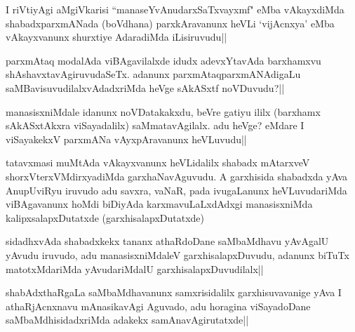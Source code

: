 \begin{artha} 
I riVtiyAgi aMgiVkarisi ``manaseYvAnudarxSaTxvayxmf" eMba vAkayxdiMda 
shabadxparxmANada (boVdhana) parxkAravanunx heVLi `vijAcnxya' eMba 
vAkayxvanunx shurxtiye AdaradiMda iLisiruvudu||
\end{artha}


\begin{artha} 
parxmAtaq modalAda viBAgavilalxde idudx adevxYtavAda barxhamxvu 
shAshavxtavAgiruvudaSeTx. adanunx parxmAtaqparxmANAdigaLu 
saMBavisuvudilalxvAdadxriMda heVge sAkASxtf noVDuvudu?||
\end{artha}


\begin{artha} 
manasisxniMdale idanunx noVDatakakxdu, beVre gatiyu ililx (barxhamx 
sAkASxtAkxra viSayadalilx) saMmatavAgilalx. adu heVge? eMdare I 
viSayakekxV parxmANa vAyxpAravanunx heVLuvudu||
\end{artha}

\begin{artha} 
tatavxmasi muMtAda vAkayxvanunx heVLidalilx shabadx mAtarxveV 
shorxVterxVMdirxyadiMda garxhaNavAguvudu. A garxhisida shabadxda yAva 
AnupUviRyu iruvudo adu savxra, vaNaR, pada ivugaLanunx heVLuvudariMda 
viBAgavanunx hoMdi biDiyAda karxmavuLaLxdAdxgi manasisxniMda 
kalipxsalapxDutatxde (garxhisalapxDutatxde)
\end{artha}

\begin{artha} 
sidadhxvAda shabadxkekx tananx athaRdoDane saMbaMdhavu yAvAgalU yAvudu 
iruvudo, adu manasisxniMdaleV garxhisalapxDuvudu, adanunx biTuTx 
matotxMdariMda yAvudariMdalU garxhisalapxDuvudilalx||
\end{artha}

\begin{artha} 
shabAdxthaRgaLa saMbaMdhavanunx samxrisidalilx garxhisuvavanige yAva I 
athaRjAcnxnavu mAnasikavAgi Aguvado, adu horagina viSayadoDane 
saMbaMdhisidadxriMda adakekx samAnavAgirutatxde||
\end{artha}

